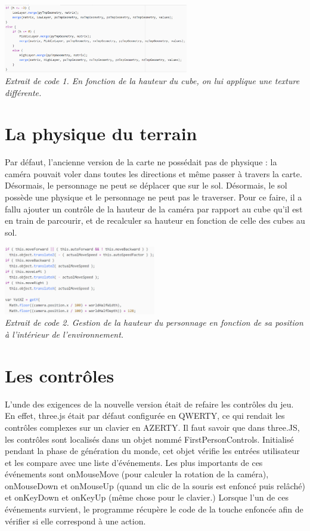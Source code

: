 \begin{center}
	\includegraphics[height=3cm]{images/code_cubes.eps}\\	
	\textit{Extrait de code 1. En fonction de la hauteur du cube, on lui applique une texture différente.}
\end{center}


\section{La physique du terrain}
Par défaut, l'ancienne version de la carte ne possédait pas de physique : la caméra pouvait voler dans toutes les directions et même passer à travers la carte. Désormais, le personnage ne peut se déplacer que sur le sol. 
Désormais, le sol possède une physique et le personnage ne peut pas le traverser. Pour ce faire, il a fallu ajouter un contrôle de la hauteur de la caméra par rapport au cube qu'il est en train de parcourir, et de recalculer sa hauteur en fonction de celle des cubes au sol. 

\begin{center}
	\includegraphics[height=3cm]{images/code_hauteur.eps}\\
	\textit{Extrait de code 2. Gestion de la hauteur du personnage en fonction de sa position à l'intérieur de l'environnement.}
\end{center}


\section{Les contrôles}
L'unde des exigences de la nouvelle version était de refaire les contrôles du jeu. En effet, three.js était par défaut configurée en QWERTY, ce qui rendait les contrôles complexes sur un clavier en AZERTY.
Il faut savoir que dans three.JS, les contrôles sont localisés dans un objet nommé FirstPersonControls. Initialisé pendant la phase de génération du monde, cet objet vérifie les entrées utilisateur et les compare avec une liste d'événements. Les plus importants de ces événements sont onMouseMove (pour calculer la rotation de la caméra), onMouseDown et onMouseUp (quand un clic de la souris est enfoncé puis relâché) et onKeyDown et onKeyUp (même chose pour le clavier.) Lorsque l'un de ces événements survient, le programme récupère le code de la touche enfoncée afin de vérifier si elle correspond à une action.

